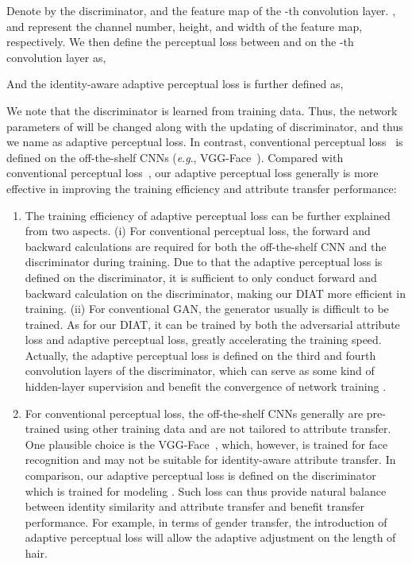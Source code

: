 \documentclass[journal]{IEEEtran}
\newcommand{\eg}{\textit{e}.\textit{g}.}
\begin{document}
Denote by  the discriminator, and  the feature map of the -th convolution layer.
,  and  represent the channel number, height, and width of the feature map, respectively.
We then define the perceptual loss between  and  on the -th convolution layer as,

And the identity-aware adaptive perceptual loss is further defined as,




We note that the discriminator  is learned from training data.
Thus, the network parameters of  will be changed along with the updating of discriminator, and thus we name  as adaptive perceptual loss.
In contrast, conventional perceptual loss~\cite{johnson2016perceptual} is defined on the off-the-shelf CNNs (\eg, VGG-Face~\cite{Parkhi15}).
Compared with conventional perceptual loss~\cite{johnson2016perceptual}, our adaptive perceptual loss generally is more effective in improving the training efficiency and attribute transfer performance:
\begin{enumerate}
\item The training efficiency of adaptive perceptual loss can be further explained from two aspects.
(i) For conventional perceptual loss, the forward and backward calculations are required for both the off-the-shelf CNN and the discriminator during training.
Due to that the adaptive perceptual loss is defined on the discriminator, it is sufficient to only conduct forward and backward calculation on the discriminator, making our DIAT more efficient in training.
(ii) For conventional GAN, the generator usually is difficult to be trained.
As for our DIAT, it can be trained by both the adversarial attribute loss and adaptive perceptual loss, greatly accelerating the training speed.
Actually, the adaptive perceptual loss is defined on the third and fourth convolution layers of the discriminator, which can serve as some kind of hidden-layer supervision and benefit the convergence of network training \cite{lee2015deeply}.
\item For conventional perceptual loss, the off-the-shelf CNNs generally are pre-trained using other training data and are not tailored to attribute transfer.
One plausible choice is the VGG-Face~\cite{Parkhi15}, which, however, is trained for face recognition and may not be suitable for identity-aware attribute transfer.
In comparison, our adaptive perceptual loss is defined on the discriminator which is trained for modeling .
Such loss can thus provide natural balance between identity similarity and attribute transfer and benefit transfer performance.
For example, in terms of gender transfer, the introduction of adaptive perceptual loss will allow the adaptive adjustment on the length of hair.

\end{enumerate}
\end{document}
